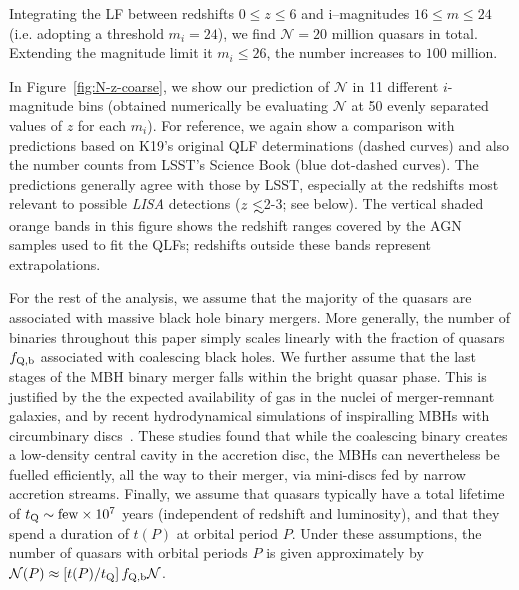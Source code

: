 \documentclass[fleqn,usenatbib]{mnras}
\newcommand\lsim{\mathrel{\rlap{\lower4pt\hbox{\hskip1pt$\sim$}}
        \raise1pt\hbox{$<$}}}
\begin{document}
Integrating the LF between redshifts $0\leq z\leq 6$ and i--magnitudes $16\leq m\leq 24$ (i.e. adopting a threshold $m_i=24$), we find $\mathcal{N}=20$ million quasars in total.  Extending the magnitude limit it $m_i\leq 26$, the number increases to $100$ million.
 
In Figure~\ref{fig:N-z-coarse}, we show our prediction of $\mathcal{N}$ in 11 different $i$-magnitude bins (obtained numerically be evaluating $\mathcal{N}$ at 50 evenly separated values of $z$ for each $m_i$). For reference, we again show a comparison with predictions based on K19's original QLF determinations (dashed curves) and also the number counts from LSST's Science Book (blue dot-dashed curves). The predictions generally agree with those by LSST, especially at the redshifts most relevant to possible {\it LISA} detections ($z\lsim$2-3; see below).  The vertical shaded orange bands in this figure shows the redshift ranges covered by the AGN samples used to fit the QLFs; redshifts outside these bands represent extrapolations.  


For the rest of the analysis, we assume that the majority of the quasars are associated with massive black hole binary mergers. More generally, the number of binaries throughout this paper simply scales linearly with the fraction of quasars $f_{\rm Q,b}$ associated with coalescing black holes. We further assume that the last stages of the MBH binary merger falls within the bright quasar phase.   This is justified by the the expected availability of gas in the nuclei of merger-remnant galaxies, and by recent hydrodynamical simulations of inspiralling MBHs with circumbinary discs~\citep{Farris+2015,Tang+2018,Bowen18}.  These studies found that while the coalescing binary creates a low-density central cavity in the accretion disc, the MBHs can nevertheless be fuelled efficiently, all the way to their merger, via mini-discs fed by narrow accretion streams.  Finally, we assume that
quasars typically have a total lifetime of $t_{\rm Q} \sim {\rm few} \times 10^7$ years (independent of redshift and luminosity), and that they spend a duration of $t(P)$ at orbital period $P$.   Under these assumptions, the number of quasars with orbital periods $P$ is given approximately by $\mathcal{N}(P)\approx \left[t(P) / t_{\rm Q}\right] f_{\rm Q,b} \mathcal{N}$.
\end{document}
